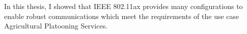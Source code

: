 In this thesis, I showed that IEEE 802.11ax provides many configurations to enable robust communications which meet the requirements of the use case Agricultural Platooning Services.



\begin{comment}
    Untersuchen, welche Routing protocols
    Wi-Fi offers a wide range of physical layer configurations, which can be used to reduce the data rate and enable robust communication.

    Future work could investigate whether modern Wi-Fi can be used for other \ac{WIC} use cases.
    IEEE 802.11bd is a new standard, which is designed for \ac{WIC} in the industrial domain.


    Guten Tag Herr Professor Sommer,

Anbei finden Sie die aktuelle Version meiner Diplomarbeit, welche nun auch die Feldversuche enthält. Wenn Sie noch nicht auf die Diplomarbeit schauen konnten oder noch vor Kapitel 4 Field Measurements sind, können Sie gerne auf die aktuelle Version im Anhang wechseln.

Die PDF musste ich komprimieren, weil sie sonst zu groß war. Wenn Sie eine unkomprimierte Version lieber wollen, kann ich ihnen gerne einen Zugang zum Git-Repro geben.

Vielen Dank,

Karl Lautenschläger
\end{comment}